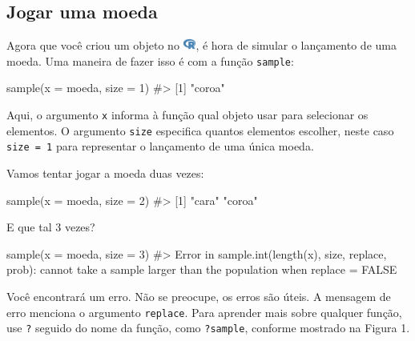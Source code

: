 \documentclass[
  letterpaper,
]{book}
\newenvironment{Shaded}{\begin{snugshade}}{\end{snugshade}}
\newcommand{\AttributeTok}[1]{\textcolor[rgb]{0.40,0.45,0.13}{#1}}
\newcommand{\CommentTok}[1]{\textcolor[rgb]{0.37,0.37,0.37}{#1}}
\newcommand{\DecValTok}[1]{\textcolor[rgb]{0.68,0.00,0.00}{#1}}
\newcommand{\FunctionTok}[1]{\textcolor[rgb]{0.28,0.35,0.67}{#1}}
\newcommand{\NormalTok}[1]{\textcolor[rgb]{0.00,0.23,0.31}{#1}}
\theoremstyle{definition}
\theoremstyle{plain}
\theoremstyle{remark}
\begin{document}
\subsection{Jogar uma moeda}\label{jogar-uma-moeda}

Agora que você criou um objeto no
\includegraphics[width=1.13em,height=1em]{getting_started_with_r_files/figure-pdf/fa-icon-9b00320707d42527dde67262afb33ded.pdf},
é hora de simular o lançamento de uma moeda. Uma maneira de fazer isso é
com a função \texttt{sample}:

\begin{Shaded}
\begin{Highlighting}[]
\FunctionTok{sample}\NormalTok{(}\AttributeTok{x =}\NormalTok{ moeda, }\AttributeTok{size =} \DecValTok{1}\NormalTok{)}
\CommentTok{\#\textgreater{} [1] "coroa"}
\end{Highlighting}
\end{Shaded}

Aqui, o argumento \texttt{x} informa à função qual objeto usar para
selecionar os elementos. O argumento \texttt{size} especifica quantos
elementos escolher, neste caso \texttt{size\ =\ 1} para representar o
lançamento de uma única moeda.

Vamos tentar jogar a moeda duas vezes:

\begin{Shaded}
\begin{Highlighting}[]
\FunctionTok{sample}\NormalTok{(}\AttributeTok{x =}\NormalTok{ moeda, }\AttributeTok{size =} \DecValTok{2}\NormalTok{)}
\CommentTok{\#\textgreater{} [1] "cara"  "coroa"}
\end{Highlighting}
\end{Shaded}

E que tal 3 vezes?

\begin{Shaded}
\begin{Highlighting}[]
\FunctionTok{sample}\NormalTok{(}\AttributeTok{x =}\NormalTok{ moeda, }\AttributeTok{size =} \DecValTok{3}\NormalTok{)}
\CommentTok{\#\textgreater{} Error in sample.int(length(x), size, replace, prob): cannot take a sample larger than the population when \textquotesingle{}replace = FALSE\textquotesingle{}}
\end{Highlighting}
\end{Shaded}

Você encontrará um erro. Não se preocupe, os erros são úteis. A mensagem
de erro menciona o argumento \texttt{replace}. Para aprender mais sobre
qualquer função, use \texttt{?} seguido do nome da função, como
\texttt{?sample}, conforme mostrado na Figura 1.
\end{document}
